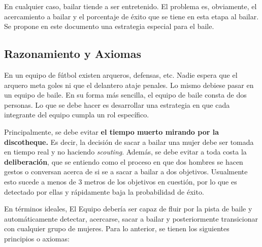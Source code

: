 \documentclass{article}
\begin{document}
En cualquier caso, bailar tiende a ser entretenido. El problema es, obviamente, el acercamiento a bailar y el porcentaje de éxito que se tiene en esta etapa al bailar. Se propone en este documento una estrategia especial para el baile.

\subsection{Razonamiento y Axiomas\label{ssec:razonamiento}}

En un equipo de fútbol existen arqueros, defensas, etc. Nadie espera que el arquero meta goles ni que el delantero ataje penales. Lo mismo debiese pasar en un equipo de baile. En su forma más sencilla, el equipo de baile consta de dos personas. Lo que se debe hacer es desarrollar una estrategia en que cada integrante del equipo cumpla un rol específico.

Principalmente, se debe evitar \textbf{el tiempo muerto mirando por la discotheque.} Es decir, la decisión de sacar a bailar una mujer debe ser tomada en tiempo real y no haciendo \textit{scouting}. Además, se debe evitar a toda costa la \textbf{deliberación}, que se entiendo como el proceso en que dos hombres se hacen gestos o conversan acerca de si se  a sacar a bailar a dos objetivos. Usualmente esto sucede a menos de 3 metros de los objetivos en cuestión, por lo que es detectado por ellas y rápidamente baja la probabilidad de éxito.

En términos ideales, El Equipo debería ser capaz de fluir por la pista de baile y automáticamente detectar, acercarse, sacar a bailar y posteriormente transicionar con cualquier grupo de mujeres. Para lo anterior, se tienen los siguientes principios o axiomas:
\end{document}
